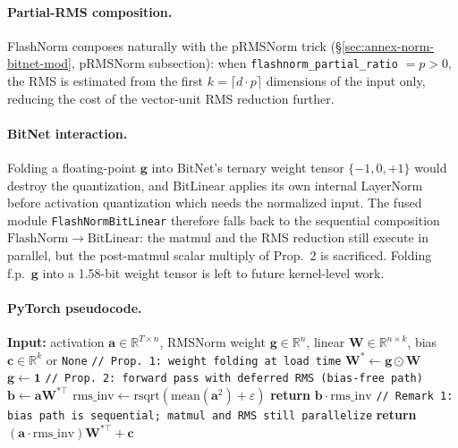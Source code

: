 \paragraph{Partial-RMS composition.}
FlashNorm composes naturally with the pRMSNorm trick (§\ref{sec:annex-norm-bitnet-mod}, pRMSNorm subsection): when \texttt{flashnorm\_partial\_ratio} $=p>0$, the RMS is estimated from the first $k=\lceil d\cdot p\rceil$ dimensions of the input only, reducing the cost of the vector-unit RMS reduction further.

\paragraph{BitNet interaction.}
Folding a floating-point $\mathbf{g}$ into BitNet's ternary weight tensor $\{-1,0,+1\}$ \citep{wang_bitnet_2023} would destroy the quantization, and BitLinear applies its own internal LayerNorm before activation quantization which needs the normalized input. The fused module \texttt{FlashNormBitLinear} therefore falls back to the sequential composition $\mathrm{FlashNorm}\to\mathrm{BitLinear}$: the matmul and the RMS reduction still execute in parallel, but the post-matmul scalar multiply of Prop.~2 is sacrificed. Folding f.p.~$\mathbf{g}$ into a 1.58-bit weight tensor is left to future kernel-level work.

\paragraph{PyTorch pseudocode.}
\begin{algorithmic}[1]
\State \textbf{Input:} activation $\mathbf{a}\in\mathbb{R}^{T\times n}$, RMSNorm weight $\mathbf{g}\in\mathbb{R}^{n}$, linear $\mathbf{W}\in\mathbb{R}^{n\times k}$, bias $\mathbf{c}\in\mathbb{R}^{k}$ or \texttt{None}
\State \texttt{// Prop. 1: weight folding at load time}
\State $\mathbf{W}^{*}\gets \mathbf{g}\odot\mathbf{W}$ 
\State $\mathbf{g}\gets \mathbf{1}$ 
\State \texttt{// Prop. 2: forward pass with deferred RMS (bias-free path)}
\State $\mathbf{b}\gets \mathbf{a}\mathbf{W}^{*\top}$ 
\State $\mathrm{rms\_inv}\gets \mathrm{rsqrt}(\mathrm{mean}(\mathbf{a}^{2})+\varepsilon)$ 
    \State \textbf{return} $\mathbf{b}\cdot\mathrm{rms\_inv}$ 
\Else
    \State \texttt{// Remark 1: bias path is sequential; matmul and RMS still parallelize}
    \State \textbf{return} $(\mathbf{a}\cdot\mathrm{rms\_inv})\mathbf{W}^{*\top}+\mathbf{c}$
\EndIf
\end{algorithmic}

